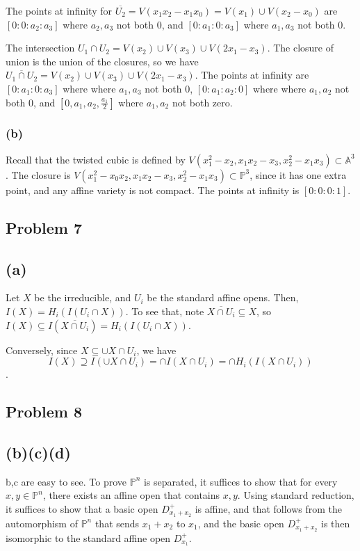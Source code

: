 \documentclass{article}
\theoremstyle{definition}
\theoremstyle{definition}
\theoremstyle{definition}
\theoremstyle{definition}
\theoremstyle{definition}
\theoremstyle{definition}
\theoremstyle{definition}
\begin{document}
The points at infinity for $\overline{U_2}=V(x_1x_2-x_1x_0)=V(x_1)\cup V(x_2-x_0)$ are $[0:0:a_2:a_3]$ where $a_2,a_3$ not both $0$, and $[0:a_1:0:a_3]$ where $a_1,a_3$ not both $0$. 


The intersection $U_1\cap U_2=V(x_2)\cup V(x_3)\cup V(2x_1-x_3)$. The closure of union is the union of the closures, so we have $\overline{U_1\cap U_2}=V(x_2)\cup V(x_3)\cup V(2x_1-x_3)$. The points at infinity are $[0:a_1:0:a_3]$ where where $a_1,a_3$ not both $0$, $[0:a_1:a_2:0]$ where where $a_1,a_2$ not both $0$, and $[0,a_1,a_2,\frac{a_1}{2}]$ where $a_1,a_2$ not both zero. 

\subsubsection*{(b)}
Recall that the twisted cubic is defined by $V(x_1^2-x_2,x_1x_2-x_3,x_2^2-x_1x_3)\subset \mathbb{A}^3$. The closure is $V(x_1^2-x_0x_2, x_1x_2-x_3,x_2^2-x_1x_3)\subset \mathbb{P}^3$, since it has one extra point, and any affine variety is not compact. The points at infinity is $[0:0:0:1]$.

\subsection*{Problem 7}
\subsection*{(a)}
Let $X$ be the irreducible, and $U_i$ be the standard affine opens. Then, $I(X)=H_i(I(U_i\cap X))$. To see that, note $\overline{X\cap U_i}\subseteq X$, so $I(X)\subseteq I(\overline{X\cap U_i})=H_i(I(U_i\cap X))$. 

Conversely, since $X\subseteq \cup X\cap U_i$, we have 
\[I(X)\supseteq I(\cup X\cap U_i)=\cap I( X\cap U_i)=\cap H_i(I( X\cap U_i))\].

\subsection*{Problem 8}
\subsection*{(b)(c)(d)}
b,c are easy to see. To prove $\mathbb{P}^n$ is separated, it suffices to show that for every $x,y\in \mathbb{P}^n$, there exists an affine open that contains $x,y$. Using standard reduction, it suffices to show that a basic open $D^+_{x_1+x_2}$ is affine, and that follows from the automorphism of $\mathbb{P}^n$ that sends $x_1+x_2$ to $x_1$, and the basic open $D^+_{x_1+x_2}$ is then isomorphic to the standard affine open $D^+_{x_1}$.
\end{document}
